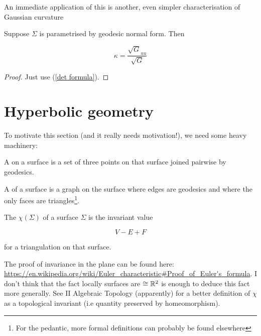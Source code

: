 \documentclass[11pt]{scrartcl}
\begin{document}

An immediate application of this is another, even simpler characterisation of Gaussian curvature

\begin{proposition}

Suppose $\Sigma$ is parametrised by geodesic normal form. Then

\begin{equation}
    \kappa = \frac{\sqrt{G}_{uu}}{\sqrt{G}}
\end{equation}

\begin{proof}
    Just use (\ref{det formula}).
\end{proof}
\end{proposition}

\section{Hyperbolic geometry}

To motivate this section (and it really needs motivation!), we need some heavy machinery:

\begin{definition}

A  on a surface is a set of three points on that surface joined pairwise by geodesics.
\end{definition}

\begin{definition}
[Triangulation]

A  of a surface is a graph on the surface where edges are geodesics and where the only faces are triangles\footnote{For the pedantic, more formal definitions can probably be found elsewhere}.
\end{definition}

\begin{definition}
The  $\chi(\Sigma)$ of a surface $\Sigma$ is the invariant value

\begin{equation}
    V - E + F
\end{equation}

for a triangulation on that surface.
\end{definition}

The proof of invariance in the plane can be found here: \url{https://en.wikipedia.org/wiki/Euler_characteristic#Proof_of_Euler's_formula}. I don't think that the fact locally surfaces are $\cong \mathbb R^2$ is enough to deduce this fact more generally. See II Algebraic Topology (apparently) for a better definition of $\chi$ as a topological invariant (i.e quantity preserved by homeomorphism).
\end{document}
